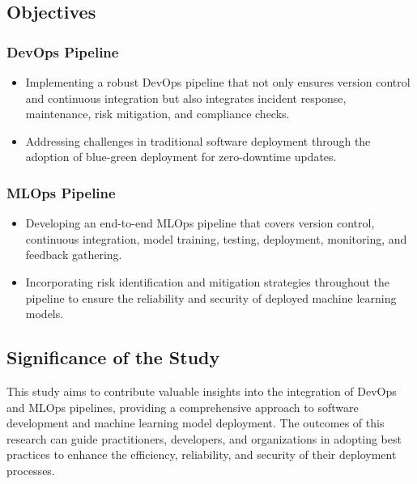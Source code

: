\documentclass[12pt, letterpaper]{article}
\begin{document}
\subsection{Objectives}

\subsubsection{DevOps Pipeline}
\begin{itemize}
    \item Implementing a robust DevOps pipeline that not only ensures version control and continuous integration but also integrates incident response, maintenance, risk mitigation, and compliance checks.
    \item Addressing challenges in traditional software deployment through the adoption of blue-green deployment for zero-downtime updates.
\end{itemize}

\subsubsection{MLOps Pipeline}
\begin{itemize}
    \item Developing an end-to-end MLOps pipeline that covers version control, continuous integration, model training, testing, deployment, monitoring, and feedback gathering.
    \item Incorporating risk identification and mitigation strategies throughout the pipeline to ensure the reliability and security of deployed machine learning models.
\end{itemize}




\subsection{Significance of the Study}
This study aims to contribute valuable insights into the integration of DevOps and MLOps pipelines, providing a comprehensive approach to software development and machine learning model deployment. The outcomes of this research can guide practitioners, developers, and organizations in adopting best practices to enhance the efficiency, reliability, and security of their deployment processes.

\end{document}
